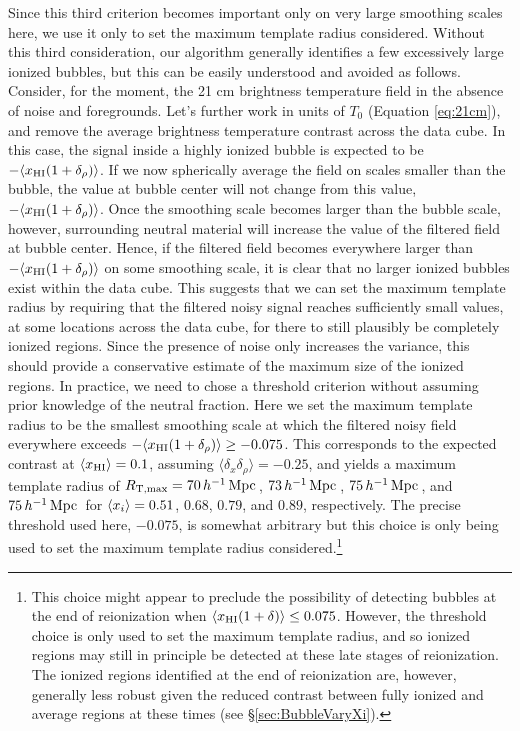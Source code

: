 Since this third criterion becomes important only on very large smoothing
scales here, we use it only to set the maximum template radius considered.
Without this third consideration, our algorithm generally identifies a few
excessively large ionized bubbles, but this can be easily understood
and avoided as follows. Consider, for the moment, the 21 cm brightness temperature
field in the absence of noise and foregrounds. Let's
further work in units of $T_0$ (Equation \ref{eq:21cm}), and
remove the average brightness temperature contrast across the data cube.
In this case, the signal inside a highly ionized bubble is 
expected to be $-\langle x_{\rm HI} (1 + \delta_\rho)\rangle$. If we now spherically average the field on scales 
smaller than the bubble, the value at bubble center will not change from 
this value, $-\langle x_{\rm HI} (1+\delta_\rho)\rangle$. Once
the smoothing scale becomes larger than the bubble scale, however, 
surrounding neutral
material will increase the value of the filtered field at bubble center. 
Hence, if the filtered field becomes everywhere larger than
$-\langle x_{\rm HI} (1 + \delta_\rho)\rangle$ on some smoothing scale, it is clear
that no larger ionized bubbles exist within the data cube. 
This suggests that we can set the maximum template radius 
by requiring that the filtered noisy signal reaches sufficiently
small values, at some locations across the data cube, for there to still plausibly be
completely ionized regions. Since the presence of noise only increases
the variance, this should provide a conservative estimate of the
maximum size of the ionized regions. In practice, we need to chose a threshold criterion without
assuming prior knowledge of the neutral fraction.
Here we set the maximum template radius to be the smallest smoothing
scale at which the filtered noisy field everywhere exceeds $-\langle x_{\rm HI} (1 + \delta_\rho)\rangle \geq - 0.075$. This corresponds to the expected contrast at $\langle x_{\text{HI}}\rangle = 0.1$, assuming $\langle\delta_x \delta_\rho\rangle=-0.25$, and yields a maximum template radius of 
$R_{\text{T,max}} = 70\,h^{-1}\,{\rm Mpc}\,$, $73\,h^{-1}\,{\rm Mpc}\,$, $75\,h^{-1}\,{\rm Mpc}\,$, and
$75\,h^{-1}\,{\rm Mpc}\,$ for $\langle x_{i} \rangle = 0.51$, $0.68$, $0.79$, and $0.89$, respectively.
The precise threshold used here, $-0.075$, is somewhat arbitrary but this choice 
is only being
used to set the maximum template radius considered.\footnote{This choice
might appear to preclude the possibility of detecting bubbles at the end of reionization when $\langle x_{\rm HI} (1 + \delta)\rangle \leq 0.075$. However, the
threshold choice is only used to set the maximum template radius, and
so ionized regions may still in principle be detected at these late
stages of reionization. The ionized regions identified 
at the end of reionization
are, however, generally less robust 
given the reduced contrast between fully ionized  
and average regions at these times (see \S \ref{sec:BubbleVaryXi}).}


